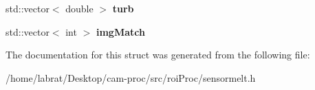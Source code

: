 \begin{DoxyCompactItemize}
\item 
std\+::vector$<$ double $>$ {\bfseries turb}\hypertarget{structSensorMelt_1_1SensorEcoPuck_a1a47d0299955549f5db63a132b33227d}{}\label{structSensorMelt_1_1SensorEcoPuck_a1a47d0299955549f5db63a132b33227d}

\item 
std\+::vector$<$ int $>$ {\bfseries img\+Match}\hypertarget{structSensorMelt_1_1SensorEcoPuck_aa46bb320a3b34dce2d5d875f65807fb4}{}\label{structSensorMelt_1_1SensorEcoPuck_aa46bb320a3b34dce2d5d875f65807fb4}

\end{DoxyCompactItemize}


The documentation for this struct was generated from the following file\+:\begin{DoxyCompactItemize}
\item 
/home/labrat/\+Desktop/cam-\/proc/src/roi\+Proc/sensormelt.\+h\end{DoxyCompactItemize}

